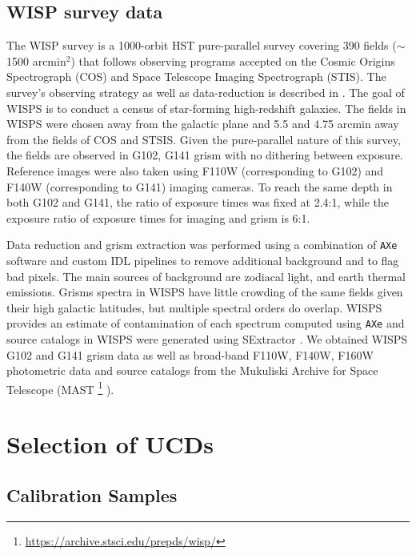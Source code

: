 \documentclass[manuscript]{aastex63}
\begin{document}
\subsection{WISP survey data}

The WISP survey is a 1000-orbit HST pure-parallel survey covering 390 fields ($\sim$1500 arcmin$^2$) that follows observing programs accepted on the Cosmic Origins Spectrograph (COS) and Space Telescope Imaging Spectrograph (STIS). The survey's observing strategy as well as data-reduction is described in \cite{2010ApJ...723..104A}. The goal of WISPS is to conduct a census of star-forming high-redshift galaxies. The fields in WISPS were chosen away from the galactic plane and  5.5 and 4.75 arcmin away from the fields of COS and STSIS. Given the pure-parallel nature of this survey, the fields are observed in G102, G141 grism with no dithering between exposure. Reference images were also taken using F110W (corresponding to G102) and F140W (corresponding to G141) imaging cameras. To reach the same depth in both G102 and G141, the ratio of exposure times was fixed at 2.4:1, while the exposure ratio of exposure times for imaging and grism is 6:1.

Data reduction and grism extraction was performed using a combination of \texttt{AXe} software \citep{Kuntschner2013, Kummel2009} and custom IDL pipelines to remove additional background and to flag bad pixels. The main sources of background are zodiacal light, and earth thermal emissions. Grisms spectra in WISPS have little crowding of the same fields given their high galactic latitudes, but multiple spectral orders do overlap. WISPS provides an estimate of contamination of each spectrum computed using \texttt{AXe} and source catalogs in WISPS were generated using SExtractor \citep{1996A&AS..117..393B}. We obtained WISPS G102 and G141 grism data as well as broad-band F110W, F140W, F160W photometric data and source catalogs from the Mukuliski Archive for Space Telescope (MAST \footnote{\url{https://archive.stsci.edu/prepds/wisp/}} ). 


\section{Selection of UCDs}\label{sec:selectionp}

\subsection{Calibration Samples}\label{trainset}
\end{document}
